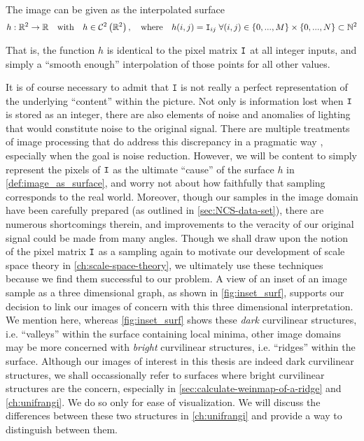 \begin{defn} The image can be given as the interpolated surface \label{def:image_as_surface}
 \begin{equation*}
 h: \mathbb{R}^2 \to \mathbb{R}
 \quad \textrm{with}\quad
 h \in \mathcal{C}^2\left(\mathbb{R}^2\right),
 \quad\textrm{where}\quad
    h(i,j) = \mathtt{I}_{ij}
    \; \forall (i,j) \in
     \left\{0,...,M\right\} \times
     \left\{0,...,N\right\} \subset \mathbb{N}^2
    \end{equation*}
\end{defn}
That is, the function $h$ is identical to the pixel matrix $\mathtt{I}$ at all integer inputs,
and simply a ``smooth enough'' interpolation of those points for all other values.


It is of course necessary to admit that $\mathtt{I}$ is not really a perfect representation of the underlying ``content'' within the picture. Not only is information lost when $\mathtt{I}$ is stored as an integer, there are also elements of noise and anomalies of lighting that would constitute noise to the original signal. There are multiple treatments of image processing that do address this discrepancy in a pragmatic way \autocite{DIPGW}, especially when the goal is noise reduction.
However, we will be content to simply represent the pixels of $\mathtt{I}$ as the ultimate ``cause'' of the surface $h$ in \cref{def:image_as_surface}, and worry not about how faithfully that sampling corresponds to the real world.
Moreover, though our samples in the image domain have been carefully prepared (as outlined in \cref{sec:NCS-data-set}), there are numerous shortcomings therein, and improvements to the veracity of our original signal could be made from many angles.
Though we shall draw upon the notion of the pixel matrix $\mathtt{I}$ as a sampling again to motivate our development of scale space theory in \cref{ch:scale-space-theory}, we ultimately use these techniques because we find them successful to our problem. A view of an inset of an image sample as a three dimensional graph, as shown in \cref{fig:inset_surf}, supports our decision to link our images of concern with this  three dimensional interpretation. We mention here, whereas \cref{fig:inset_surf} shows these \textit{dark} curvilinear structures, i.e. ``valleys'' within the surface containing local minima, other image domains may be more concerned with \textit{bright} curvilinear structures, i.e. ``ridges'' within the surface. Although our images of interest in this thesis are indeed dark curvilinear structures, we shall occassionally refer to surfaces where bright curvilinear structures are the concern, especially in \cref{sec:calculate-weinmap-of-a-ridge} and \cref{ch:unifrangi}. We do so only for ease of visualization. We will discuss the differences between these two structures in \cref{ch:unifrangi} and provide a way to distinguish between them.

